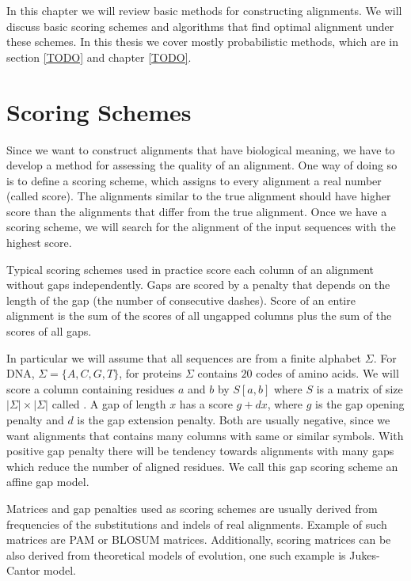In this chapter we will review basic methods for constructing alignments. We
will discuss basic scoring schemes and algorithms that find optimal alignment
under these schemes. In this thesis we cover mostly probabilistic methods,
which are in section \ref{TODO} and chapter \ref{TODO}.


\section{Scoring Schemes}

Since we want to construct alignments that have biological meaning, we have to
develop a method for assessing the quality of an alignment. One way of doing so
is to define a scoring scheme, which assigns to every alignment a real number
(called score). The alignments similar to the true alignment should have higher
score than the alignments that differ from the true alignment. Once we have a
scoring scheme, we will search for the alignment of the input sequences with
the highest score.

Typical scoring schemes used in practice score each column of
an alignment without gaps independently. Gaps are scored by a penalty
that depends on the length of the gap (the number of consecutive dashes). Score
of an entire alignment is the sum of the scores of all ungapped columns plus the
sum of the scores of all gaps.

In particular
we will assume that all sequences are from a finite alphabet $\Sigma$. For DNA,
$\Sigma=\{A,C,G,T\}$, for proteins $\Sigma$ contains $20$ codes of amino acids.
We will score a column containing residues $a$ and $b$ by $S[a,b]$ where $S$ is
a matrix of size $|\Sigma|\times|\Sigma|$ called .  A gap of length $x$ has a score $g+dx$, where $g$ is the gap opening
penalty and $d$ is the gap extension penalty. Both are usually negative, since we
want alignments that contains many columns with same or similar symbols. With
positive gap penalty there will be tendency towards alignments with many gaps
which reduce the number of aligned residues.  We call this gap scoring scheme an
affine gap model. 

Matrices and gap penalties used as scoring schemes are usually derived from
frequencies of the substitutions and indels of real alignments. Example of such
matrices are PAM or BLOSUM matrices\cite{Durbin1998}. Additionally, scoring
matrices can be also derived from theoretical models of evolution, one such
example is Jukes-Cantor model\cite{Durbin1998}.

